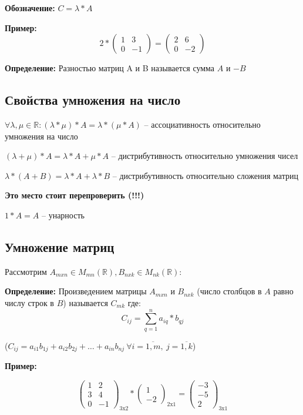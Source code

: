 \documentclass[a4paper,12pt]{article}
\begin{document}
	{\bf Обозначение: } $C = \lambda * A$

	{\bf Пример: }
	\[
		2 * 
		\begin{pmatrix}
			1 & 3 \\
			0 & -1
		\end{pmatrix}
		=
		\begin{pmatrix}
			2 & 6 \\
			0 & -2
		\end{pmatrix}
	\]

	{\bf Определение: } Разностью матриц A и B называется сумма $A$ и $-B$

	\subsection {Свойства умножения на число}

	$\forall \lambda, \mu \in \mathbb R: (\lambda * \mu) * A = \lambda * (\mu * A)$ -- ассоциативность относительно умножения на число

	$(\lambda + \mu) * A = \lambda * A + \mu * A$ -- дистрибутивность относительно умножения чисел

	$\lambda * (A + B) = \lambda * A + \lambda * B$ -- дистрибутивность относительно сложения матриц

	{\bf Это место стоит перепроверить (!!!) } 

	$1 * A = A$ -- унарность

	\subsection{Умножение матриц}

	Рассмотрим $A_{mxn} \in M_{mn}(\mathbb R), B_{nxk} \in M_{nk}(\mathbb R)$:

	{\bf Определение: }
	Произведением матрицы $A_{mxn}$ и $B_{nxk}$ (число столбцов в $A$ равно числу строк в $B$) называется $C_{mk}$ где:
	\[
		C_{ij}=\sum_{q=1}^{n} a_{iq} * b_{qj}
	\]
	
	($C_{ij}=a_{i1} b_{1j}+a_{i2} b_{2j}+\ldots+a_{in} b_{nj}~\forall i=\overline{1,m},~j=\overline{1,k}$)

	{\bf Пример:}

	\[
		\begin{pmatrix}
			1 & 2 \\
			3 & 4 \\
			0 & -1
		\end{pmatrix}_{\text{3x2}}
		*
		\begin{pmatrix}
			1 \\
			-2
		\end{pmatrix}_{\text{2x1}}
		=
		\begin{pmatrix}
			-3 \\
			-5 \\
			2
		\end{pmatrix}_{\text{3x1}}
	\]
\end{document}
